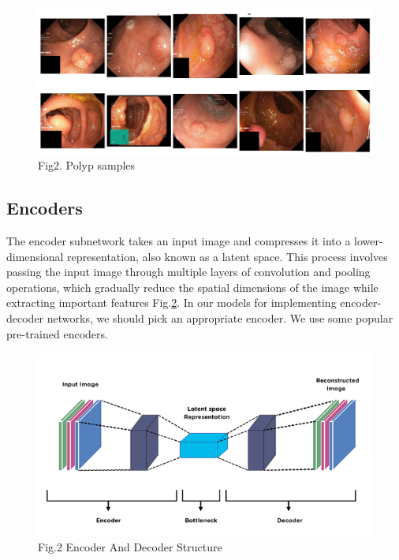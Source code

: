 \documentclass[12pt]{article}
\begin{document}
\begin{figure}[H]
\includegraphics[width=1\textwidth]{Figs/Kvasir-SEG-sample.png}
\caption{Fig2. Polyp samples}
\label{fig:Dataset}
\end{figure}
	
	\subsection{Encoders}
	
	The encoder subnetwork takes an input image and compresses it into a lower-dimensional representation, also known as a latent space. This process involves passing the input image through multiple layers of convolution and pooling operations, which gradually reduce the spatial dimensions of the image while extracting important features Fig.\ref{fig:encoder}. In our models for implementing encoder-decoder networks, we should pick an appropriate encoder. We use some popular pre-trained encoders.
	
\begin{center}
\begin{figure}[H]
\includegraphics[width=1\textwidth]{Figs/encoder-decoder.png}
\caption{Fig.2 Encoder And Decoder Structure}
\label{fig:encoder}
\end{figure}
\end{center}
	
\end{document}
